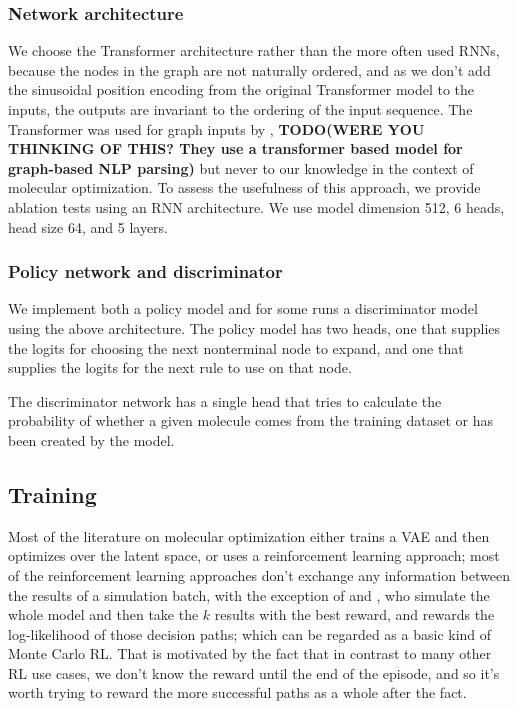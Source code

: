 \documentclass{article}
\newcommand{\TODO}[1]{{\bf TODO(#1)}}
\begin{document}
\subsubsection{Network architecture}
We choose the Transformer architecture \cite{vaswani2017} rather than the more often used RNNs, because the nodes in the graph are not naturally ordered, and as we don't add the sinusoidal position encoding from the original Transformer model to the inputs, the outputs are invariant to the ordering of the input sequence. The Transformer was used for graph inputs by \cite{kondratyuk2019}, \TODO{WERE YOU THINKING OF THIS? They use a transformer based model for graph-based NLP parsing} but never to our knowledge in the context of molecular optimization. To assess the usefulness of this approach, we provide ablation tests using an RNN architecture. We use model dimension 512, 6 heads, head size 64, and 5 layers. 

\subsubsection{Policy network and discriminator}
We implement both a policy model and for some runs a discriminator model using the above architecture. The policy model has two heads, one that supplies the logits for choosing the next nonterminal node to expand, and one that supplies the logits for the next rule to use on that node.

The discriminator network has a single head that tries to calculate the probability of whether a given molecule comes from the training dataset or has been created by the model.

\subsection{Training}\label{sec:training}
Most of the literature on molecular optimization either trains a VAE and then optimizes over the latent space, or uses a reinforcement learning approach; most of the reinforcement learning approaches don't exchange any information between the results of a simulation batch, with the exception of \cite{segler2017, neil2018} and \cite{kraev2018}, who simulate the whole model and then take the $k$ results with the best reward, and rewards the log-likelihood of those decision paths; which can be regarded as a basic kind of Monte Carlo RL. That is motivated by the fact that in contrast to many other RL use cases, we don't know the reward until the end of the episode, and so it's worth trying to reward the more successful paths as a whole after the fact.
\end{document}

